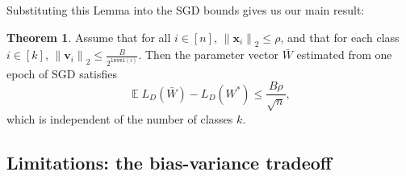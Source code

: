 \documentclass[twoside]{article}
\theoremstyle{definition}
\newtheorem{lemma}{Lemma}
\newtheorem{theorem}{Theorem}
\DeclareMathOperator{\ddim}{c_{\text{dd}}}
\DeclareMathOperator{\E}{\mathbb E}
\DeclareMathOperator*{\argmin}{arg\,min}
\newcommand{\vv}{\mathbf v}
\newcommand{\w}{\mathbf w}
\newcommand{\x}{\mathbf x}
\newcommand{\ltwo}[1]{{\lVert {#1} \rVert}_2}
\newcommand{\lF}[1]{{\lVert {#1} \rVert}_F}
\newcommand{\level}[1]{\texttt{level}({#1})}
\begin{document}
Substituting this Lemma into the SGD bounds gives us our main result: 

\begin{theorem}
\label{theorem:xentropy}
Assume that for all $i\in[n]$, $\ltwo{\x_i} \le \rho$,
    and that for each class $i\in[k]$,  $\ltwo{\vv _i} \le \frac{B}{2^{\level i}}$.
Then the parameter vector $\bar W$ estimated from one epoch of SGD satisfies
\begin{equation}
    \E L_D(\bar W) - L_D(W^*) \le \frac {B\rho}{\sqrt n}
    ,
\end{equation}
which is independent of the number of classes $k$.
\end{theorem}




\subsection{Limitations: the bias-variance tradeoff}
\end{document}
